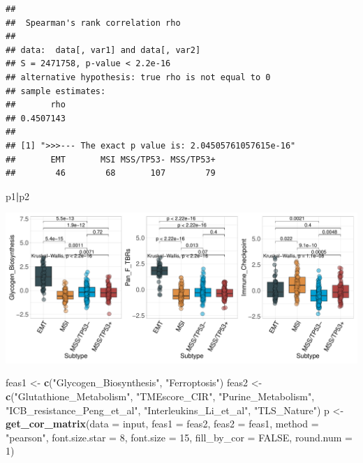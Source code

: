 \documentclass[
  12pt,
]{book}
\newenvironment{Shaded}{\begin{snugshade}}{\end{snugshade}}
\newcommand{\AttributeTok}[1]{\textcolor[rgb]{0.13,0.29,0.53}{#1}}
\newcommand{\ConstantTok}[1]{\textcolor[rgb]{0.56,0.35,0.01}{#1}}
\newcommand{\DecValTok}[1]{\textcolor[rgb]{0.00,0.00,0.81}{#1}}
\newcommand{\FunctionTok}[1]{\textcolor[rgb]{0.13,0.29,0.53}{\textbf{#1}}}
\newcommand{\NormalTok}[1]{#1}
\newcommand{\OtherTok}[1]{\textcolor[rgb]{0.56,0.35,0.01}{#1}}
\newcommand{\SpecialCharTok}[1]{\textcolor[rgb]{0.81,0.36,0.00}{\textbf{#1}}}
\newcommand{\StringTok}[1]{\textcolor[rgb]{0.31,0.60,0.02}{#1}}
\theoremstyle{definition}
\theoremstyle{definition}
\theoremstyle{definition}
\theoremstyle{definition}
\theoremstyle{remark}
\begin{document}
\begin{verbatim}
## 
##  Spearman's rank correlation rho
## 
## data:  data[, var1] and data[, var2]
## S = 2471758, p-value < 2.2e-16
## alternative hypothesis: true rho is not equal to 0
## sample estimates:
##       rho 
## 0.4507143 
## 
## [1] ">>>--- The exact p value is: 2.04505761057615e-16"
##       EMT       MSI MSS/TP53- MSS/TP53+ 
##        46        68       107        79
\end{verbatim}

\begin{Shaded}
\begin{Highlighting}[]
\NormalTok{p1}\SpecialCharTok{|}\NormalTok{p2}
\end{Highlighting}
\end{Shaded}

\includegraphics{_main_files/figure-latex/unnamed-chunk-40-1.pdf}

\begin{Shaded}
\begin{Highlighting}[]
\NormalTok{feas1 }\OtherTok{\textless{}{-}} \FunctionTok{c}\NormalTok{(}\StringTok{"Glycogen\_Biosynthesis"}\NormalTok{, }\StringTok{"Ferroptosis"}\NormalTok{)}
\NormalTok{feas2 }\OtherTok{\textless{}{-}} \FunctionTok{c}\NormalTok{(}\StringTok{"Glutathione\_Metabolism"}\NormalTok{, }\StringTok{"TMEscore\_CIR"}\NormalTok{, }\StringTok{"Purine\_Metabolism"}\NormalTok{, }\StringTok{"ICB\_resistance\_Peng\_et\_al"}\NormalTok{, }\StringTok{"Interleukins\_Li\_et\_al"}\NormalTok{, }\StringTok{"TLS\_Nature"}\NormalTok{)}
\NormalTok{p }\OtherTok{\textless{}{-}} \FunctionTok{get\_cor\_matrix}\NormalTok{(}\AttributeTok{data           =}\NormalTok{ input, }
                    \AttributeTok{feas1          =}\NormalTok{ feas2, }
                    \AttributeTok{feas2          =}\NormalTok{ feas1,}
                    \AttributeTok{method         =} \StringTok{"pearson"}\NormalTok{,}
                    \AttributeTok{font.size.star =} \DecValTok{8}\NormalTok{, }
                    \AttributeTok{font.size      =} \DecValTok{15}\NormalTok{, }
                    \AttributeTok{fill\_by\_cor    =} \ConstantTok{FALSE}\NormalTok{, }
                    \AttributeTok{round.num      =} \DecValTok{1}\NormalTok{)}
\end{Highlighting}
\end{Shaded}
\end{document}

